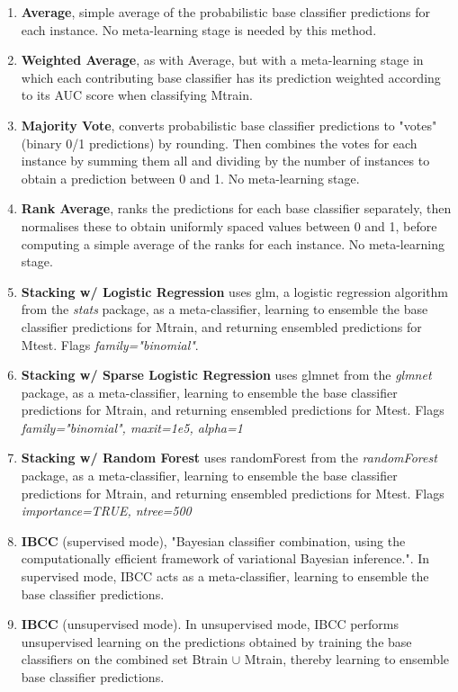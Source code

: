 \documentclass{bmcart}
\begin{document}
\begin{enumerate}
    \item \textbf{Average}, simple average of the probabilistic base classifier predictions for each instance. No meta-learning stage is needed by this method.
    \item \textbf{Weighted Average}, as with Average, but with a meta-learning stage in which each contributing base classifier has its prediction weighted according to its AUC score when classifying Mtrain.
    \item \textbf{Majority Vote}, converts probabilistic base classifier predictions to "votes" (binary 0/1 predictions) by rounding. Then combines the votes for each instance by summing them all and dividing by the number of instances to obtain a prediction between 0 and 1. No meta-learning stage.
    \item \textbf{Rank Average}, ranks the predictions for each base classifier separately, then normalises these to obtain uniformly spaced values between 0 and 1, before computing a simple average of the ranks for each instance. No meta-learning stage.
    \item \textbf{Stacking w/ Logistic Regression} uses glm, a logistic regression algorithm from the \textit{stats} package, as a meta-classifier, learning to ensemble the base classifier predictions for Mtrain, and returning ensembled predictions for Mtest. Flags \textit{family="binomial"}.
    \item \textbf{Stacking w/ Sparse Logistic Regression} uses glmnet from the \textit{glmnet} package, as a meta-classifier, learning to ensemble the base classifier predictions for Mtrain, and returning ensembled predictions for Mtest. Flags \textit{family="binomial", maxit=1e5, alpha=1}
    \item \textbf{Stacking w/ Random Forest} uses randomForest from the \textit{randomForest} package, as a meta-classifier, learning to ensemble the base classifier predictions for Mtrain, and returning ensembled predictions for Mtest. Flags \textit{importance=TRUE, ntree=500}
    \item \textbf{IBCC} (supervised mode), "Bayesian classifier combination, using the computationally efficient framework of variational Bayesian inference."\cite{Simpson13}. In supervised mode, IBCC acts as a meta-classifier, learning to ensemble the base classifier predictions.
    \item \textbf{IBCC} (unsupervised mode). In unsupervised mode, IBCC performs unsupervised learning on the predictions obtained by training the base classifiers on the combined set Btrain $\cup$ Mtrain, thereby learning to ensemble base classifier predictions.
\end{enumerate}
\end{document}
